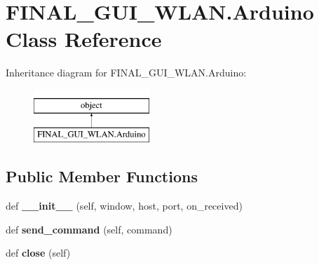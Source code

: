 \hypertarget{class_f_i_n_a_l___g_u_i___w_l_a_n_1_1_arduino}{}\section{F\+I\+N\+A\+L\+\_\+\+G\+U\+I\+\_\+\+W\+L\+A\+N.\+Arduino Class Reference}
\label{class_f_i_n_a_l___g_u_i___w_l_a_n_1_1_arduino}
Inheritance diagram for F\+I\+N\+A\+L\+\_\+\+G\+U\+I\+\_\+\+W\+L\+A\+N.\+Arduino\+:\begin{figure}[H]
\begin{center}
\leavevmode
\includegraphics[height=2.000000cm]{class_f_i_n_a_l___g_u_i___w_l_a_n_1_1_arduino}
\end{center}
\end{figure}
\subsection*{Public Member Functions}
\begin{DoxyCompactItemize}
\item 
\mbox{\label{class_f_i_n_a_l___g_u_i___w_l_a_n_1_1_arduino_ac826ff80647459671ac4367c0c11b7b1}} 
def {\bfseries \+\_\+\+\_\+init\+\_\+\+\_\+} (self, window, host, port, on\+\_\+received)
\item 
\mbox{\label{class_f_i_n_a_l___g_u_i___w_l_a_n_1_1_arduino_a2a13c6006cd466ac37ce8e2033d04e96}} 
def {\bfseries send\+\_\+command} (self, command)
\item 
\mbox{\label{class_f_i_n_a_l___g_u_i___w_l_a_n_1_1_arduino_a07b83bfe05b0faf47ad2e6730d3ae795}} 
def {\bfseries close} (self)
\end{DoxyCompactItemize}
